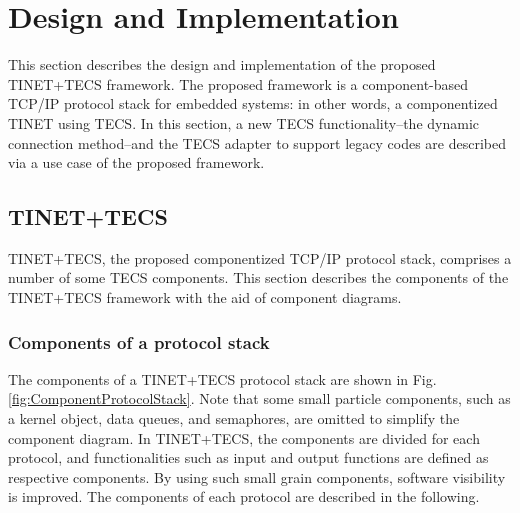 \documentclass[conference]{IEEEtran/IEEEtran}
\begin{document}
\section{Design and Implementation}
\label{sec:Design and Implementation}

This section describes the design and implementation of the proposed TINET+TECS framework.
The proposed framework is a component-based TCP/IP protocol stack for embedded systems: in other words, a componentized TINET using TECS.
In this section, a new TECS functionality--the dynamic connection method--and the TECS adapter to support legacy codes are described via a use case of the proposed framework.

\subsection{TINET+TECS}
\label{sec:TINET+TECS}

TINET+TECS, the proposed componentized TCP/IP protocol stack, comprises a number of some TECS components.
This section describes the components of the TINET+TECS framework with the aid of component diagrams.

\subsubsection{Components of a protocol stack}

The components of a TINET+TECS protocol stack are shown in Fig. \ref{fig:ComponentProtocolStack}.
Note that some small particle components, such as a kernel object, data queues, and semaphores, are omitted to simplify the component diagram.
In TINET+TECS, the components are divided for each protocol, and functionalities such as input and output functions are defined as respective components.
By using such small grain components, software visibility is improved.
The components of each protocol are described in the following.
\end{document}

